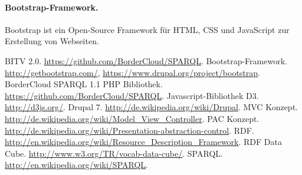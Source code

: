 \documentclass[a4paper,11pt,twoside]{article}
\begin{document}
\paragraph{Bootstrap-Framework.} 
Bootstrap \cite{Bootstrap} ist ein Open-Source Framework für HTML, CSS und
JavaScript zur Erstellung von Webseiten.


\begin{thebibliography}{xxx}\raggedright
{} BITV 2.0.  \url{https://github.com/BorderCloud/SPARQL}.
 Bootstrap-Framework.  \url{http://getbootstrap.com/},
  \url{https://www.drupal.org/project/bootstrap}. 
 BorderCloud SPARQL 1.1 PHP Bibliothek.
  \url{https://github.com/BorderCloud/SPARQL}.
 Javascript-Bibliothek D3. \url{http://d3js.org/}.
 Drupal 7. \url{http://de.wikipedia.org/wiki/Drupal}.
 MVC Konzept.
  \url{http://de.wikipedia.org/wiki/Model_View_Controller}.
 PAC Konzept.
  \url{http://de.wikipedia.org/wiki/Presentation-abstraction-control}.
 RDF.
  \url{http://en.wikipedia.org/wiki/Resource_Description_Framework}.
 RDF Data Cube.  \url{http://www.w3.org/TR/vocab-data-cube/}.
 SPARQL. \url{http://en.wikipedia.org/wiki/SPARQL}.

\end{thebibliography}
\end{document}
